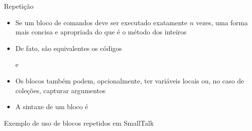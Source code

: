 \begin{frame}[fragile]{Repetição}

    \begin{itemize}
        \item Se um bloco de comandos deve ser executado exatamente $n$ vezes, uma forma mais
            concisa e apropriada do que   é o método 
             dos inteiros


        \item De fato, são equivalentes os códigos


        e

        \item Os blocos também podem, opcionalmente, ter variáveis locais ou, no caso de
            coleções, capturar argumentos 

        \item A sintaxe de um bloco é

    \end{itemize}

\end{frame}

\begin{frame}[fragile]{Exemplo de uso de blocos repetidos em SmallTalk}
\end{frame}


